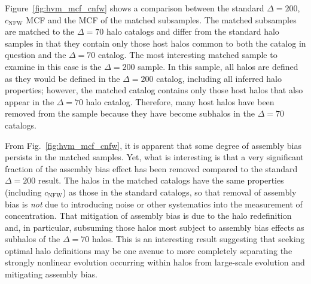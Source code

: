 \documentclass[usenatbib,usegraphicx,letterpaper]{mn2e}
\begin{document}
Figure~\ref{fig:hvm_mcf_cnfw} shows a comparison between the standard $\Delta=200$, $c_{\mathrm{NFW}}$ 
MCF and the MCF of the matched subsamples. The matched subsamples are matched to the $\Delta=70$ 
halo catalogs and differ from the standard halo samples in that they contain only those host halos common 
to both the catalog in question and the $\Delta=70$ catalog. The most interesting matched sample to 
examine in this case is the $\Delta=200$ sample. In this sample, all halos are defined as they would be 
defined in the $\Delta=200$ catalog, including all inferred halo properties; however, the matched catalog 
contains only those host halos that also appear in the $\Delta=70$ halo catalog. Therefore, many host 
halos have been removed from the sample because they have become subhalos in the $\Delta=70$ 
catalogs. 

From Fig.~\ref{fig:hvm_mcf_cnfw}, it is apparent that some degree of assembly bias persists in the matched 
samples. Yet, what is interesting is that a very significant fraction of the assembly bias effect has been 
removed compared to the standard $\Delta=200$ result. The halos in the matched catalogs have the 
same properties (including $c_{\mathrm{NFW}}$) as those in the standard catalogs, so that removal 
of assembly bias is {\em not} due to introducing noise or other systematics into the measurement of 
concentration. That mitigation of assembly bias is due to the halo redefinition and, in particular, 
subsuming those halos most subject to assembly bias effects as subhalos of the $\Delta=70$ 
halos. This is an interesting result suggesting that seeking optimal halo definitions may be 
one avenue to more completely separating the strongly nonlinear evolution occurring within 
halos from large-scale evolution and mitigating assembly bias. 
\end{document}
